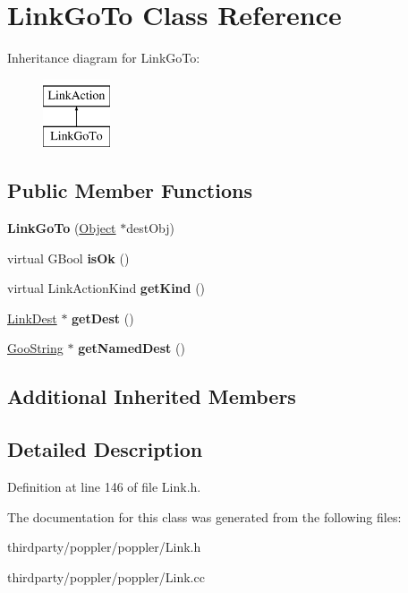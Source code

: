 \hypertarget{class_link_go_to}{}\section{Link\+Go\+To Class Reference}
\label{class_link_go_to}
Inheritance diagram for Link\+Go\+To\+:\begin{figure}[H]
\begin{center}
\leavevmode
\includegraphics[height=2.000000cm]{class_link_go_to}
\end{center}
\end{figure}
\subsection*{Public Member Functions}
\begin{DoxyCompactItemize}
\item 
\mbox{\label{class_link_go_to_adde43012572efa5f8842680c43ae7302}} 
{\bfseries Link\+Go\+To} (\hyperlink{class_object}{Object} $\ast$dest\+Obj)
\item 
\mbox{\label{class_link_go_to_a6e6ee0c360fa17c9d2b534c3bda8a978}} 
virtual G\+Bool {\bfseries is\+Ok} ()
\item 
\mbox{\label{class_link_go_to_a0c129ba5c2198a2190f9aac7c4e3848c}} 
virtual Link\+Action\+Kind {\bfseries get\+Kind} ()
\item 
\mbox{\label{class_link_go_to_a39d12385fc13d64f8d78930af8f672dc}} 
\hyperlink{class_link_dest}{Link\+Dest} $\ast$ {\bfseries get\+Dest} ()
\item 
\mbox{\label{class_link_go_to_ac2e55c00b39b5f8afa0498e7cacb2ca4}} 
\hyperlink{class_goo_string}{Goo\+String} $\ast$ {\bfseries get\+Named\+Dest} ()
\end{DoxyCompactItemize}
\subsection*{Additional Inherited Members}


\subsection{Detailed Description}


Definition at line 146 of file Link.\+h.



The documentation for this class was generated from the following files\+:\begin{DoxyCompactItemize}
\item 
thirdparty/poppler/poppler/Link.\+h\item 
thirdparty/poppler/poppler/Link.\+cc\end{DoxyCompactItemize}
